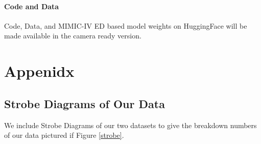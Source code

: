 \documentclass{article}
\theoremstyle{plain}
\theoremstyle{definition}
\theoremstyle{remark}
\begin{document}
{\paragraph{Code and Data} Code, Data, and MIMIC-IV ED based model weights on HuggingFace will be made available in the camera ready version.







\newpage
\appendix
\onecolumn
\section{Appenidx}


\subsection{Strobe Diagrams of Our Data}
\label{strober}

We include Strobe Diagrams of our two datasets to give the breakdown numbers of our data pictured if Figure \ref{strobe}.

}
\end{document}
